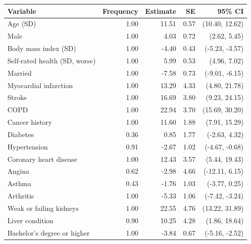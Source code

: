 \begin{tabular}{lrrrr}
\toprule
Variable & Frequency & Estimate & SE & 95\% CI\\
\midrule
Age (SD) & 1.00 & 11.51 & 0.57 & (10.40, 12.62)\\
Male & 1.00 & 4.03 & 0.72 & (2.62, 5.45)\\
Body mass index (SD) & 1.00 & -4.40 & 0.43 & (-5.23, -3.57)\\
Self-rated health (SD, worse) & 1.00 & 5.99 & 0.53 & (4.96, 7.02)\\
Married & 1.00 & -7.58 & 0.73 & (-9.01, -6.15)\\
Myocardial infarction & 1.00 & 13.29 & 4.33 & (4.80, 21.78)\\
Stroke & 1.00 & 16.69 & 3.80 & (9.23, 24.15)\\
COPD & 1.00 & 22.94 & 3.70 & (15.69, 30.20)\\
Cancer history & 1.00 & 11.60 & 1.88 & (7.91, 15.29)\\
Diabetes & 0.36 & 0.85 & 1.77 & (-2.63, 4.32)\\
Hypertension & 0.91 & -2.67 & 1.02 & (-4.67, -0.68)\\
Coronary heart disease & 1.00 & 12.43 & 3.57 & (5.44, 19.43)\\
Angina & 0.62 & -2.98 & 4.66 & (-12.11, 6.15)\\
Asthma & 0.43 & -1.76 & 1.03 & (-3.77, 0.25)\\
Arthritis & 1.00 & -5.33 & 1.06 & (-7.42, -3.24)\\
Weak or failing kidneys & 1.00 & 22.55 & 4.76 & (13.22, 31.89)\\
Liver condition & 0.90 & 10.25 & 4.28 & (1.86, 18.64)\\
Bachelor's degree or higher & 1.00 & -3.84 & 0.67 & (-5.16, -2.52)\\
\bottomrule
\end{tabular}
